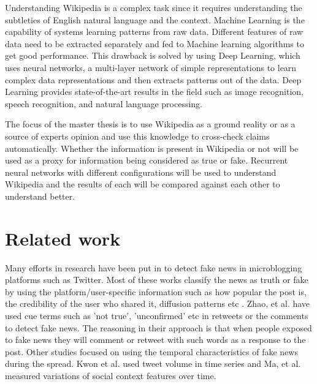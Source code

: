 \documentclass[a4paper, 11pt]{article}
\begin{document}
Understanding Wikipedia is a complex task since it requires understanding the subtleties of English natural language and the context. Machine Learning is the capability of systems learning patterns from raw data. Different features of raw data need to be extracted separately and fed to Machine learning algorithms to get good performance. This drawback is solved by using Deep Learning, which uses neural networks, a multi-layer network of simple representations to learn complex data representations and then extracts patterns out of the data\cite{Goodfellow2016}. Deep Learning provides state-of-the-art results in the field such as image recognition, speech recognition, and natural language processing.

The focus of the master thesis is to use Wikipedia as a ground reality or as a source of experts opinion and use this knowledge to cross-check claims automatically. Whether the information is present in Wikipedia or not will be used as a proxy for information being considered as true or fake. Recurrent neural networks with different configurations will be used to understand Wikipedia and the results of each will be compared against each other to understand better.

\section{Related work}


Many efforts in research have been put in to detect fake news in microblogging platforms such as Twitter. Most of these works classify the news as truth or fake by using the platform/user-specific information such as how popular the post is, the credibility of the user who shared it, diffusion patterns etc \cite{Liu2015} \cite{Ma2015}. Zhao, et al. \cite{Zhao2015} have used cue terms such as 'not true', 'unconfirmed' etc in retweets or the comments to detect fake news. The reasoning in their approach is that when people exposed to fake news they will comment or retweet with such words as a response to the post. Other studies focused on using the temporal characteristics of fake news during the spread. Kwon et al.\cite{Kwon2013} used tweet volume in time series and Ma, et al.\cite{Ma2015} measured variations of social context features over time. 
\end{document}
